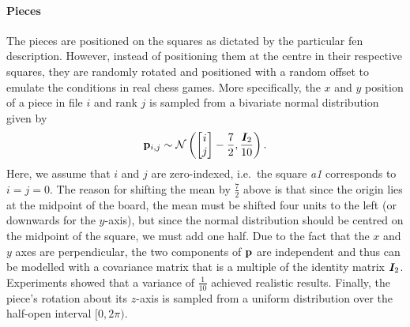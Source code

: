 \documentclass[../report.tex]{subfiles}
\begin{document}
\paragraph{Pieces}
The pieces are positioned on the squares as dictated by the particular \gls{fen} description.
However, instead of positioning them at the centre in their respective squares, they are randomly rotated and positioned with a random offset to emulate the conditions in real chess games.
More specifically, the $x$ and $y$ position of a piece in file $i$ and rank $j$ is sampled from a bivariate normal distribution given by
\begin{equation*}
    {\mathbf{p}}_{i,j} \sim \mathcal{N} \left(
        \begin{bmatrix}
            i \\ j
        \end{bmatrix} - \frac{7}{2},
        \frac{{\bm{I}}_2}{10}
    \right).
\end{equation*}
Here, we assume that $i$ and $j$ are zero-indexed, i.e.\ the square \emph{a1} corresponds to $i=j=0$.
The reason for shifting the mean by $\frac{7}{2}$ above is that since the origin lies at the midpoint of the board, the mean must be shifted four units to the left (or downwards for the $y$-axis), but since the normal distribution should be centred on the midpoint of the square, we must add one half.
Due to the fact that the $x$ and $y$ axes are perpendicular, the two components of ${\mathbf{p}}$ are independent and thus can be modelled with a covariance matrix that is a multiple of the identity matrix ${\bm{I}}_2$.
Experiments showed that a variance of $\frac{1}{10}$ achieved realistic results.
Finally, the piece's rotation about its $z$-axis is sampled from a uniform distribution over the half-open interval $[0, 2\pi)$.
\end{document}

